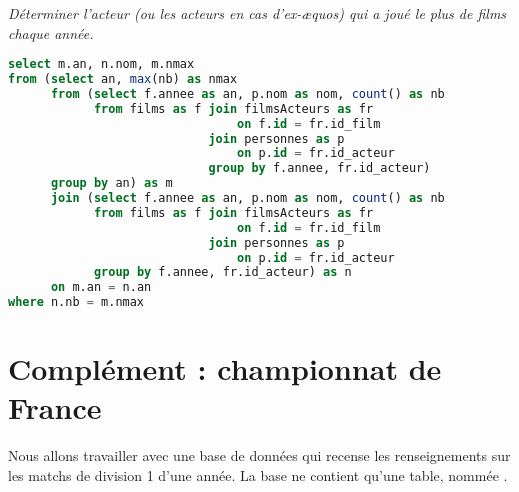 \begin{Exercise}[difficulty = 2] \it Déterminer l'acteur (ou les acteurs en cas d'ex-æquos) qui a joué le plus de films chaque année.
\end{Exercise}
\begin{Answer}
\begin{lstlisting}[language=SQL]
select m.an, n.nom, m.nmax
from (select an, max(nb) as nmax
      from (select f.annee as an, p.nom as nom, count() as nb
            from films as f join filmsActeurs as fr 
                                on f.id = fr.id_film
                            join personnes as p 
                                on p.id = fr.id_acteur
                            group by f.annee, fr.id_acteur)
	  group by an) as m
	  join (select f.annee as an, p.nom as nom, count() as nb
            from films as f join filmsActeurs as fr 
                                on f.id = fr.id_film
                            join personnes as p 
                                on p.id = fr.id_acteur
            group by f.annee, fr.id_acteur) as n
	  on m.an = n.an
where n.nb = m.nmax
\end{lstlisting}
\end{Answer}
\newpage
\section{Complément : championnat de France}
Nous allons travailler avec une base de données qui recense les renseignements sur les matchs de division 1 d'une année.
La base ne contient qu'une table, nommée .

\medskip

